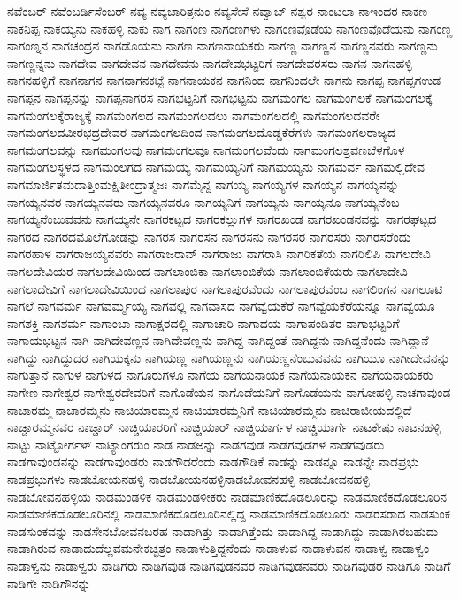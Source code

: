 {ನವೆಂಬರ್
ನವೆಂಬರ್ಡಿಸೆಂಬರ್
ನವ್ಯ
ನವ್ಯಚಾರಿತ್ರನುಂ
ನವ್ಯಸೇಸೆ
ನವ್ವಾಬ್
ನಶ್ವರ
ನಾಂಟಲಾ
ನಾಇಂದರ
ನಾಕಣ
ನಾಕನಿಪ್ಪ
ನಾಕಯ್ಯನು
ನಾಕಹಳ್ಳಿ
ನಾಕು
ನಾಗ
ನಾಗಂಣ
ನಾಗಂಣಗಳು
ನಾಗಂಣವೊಡೆಯ
ನಾಗಂಣವೊಡೆಯನು
ನಾಗಂಣ್ಣ
ನಾಗಂಣ್ನನ
ನಾಗಚಂದ್ರನ
ನಾಗಡೊಯನು
ನಾಗಣ
ನಾಗಣನಾಯಕರು
ನಾಗಣ್ಣ
ನಾಗಣ್ಣನ
ನಾಗಣ್ಣನವರು
ನಾಗಣ್ಣನು
ನಾಗಣ್ಣನ್ನನು
ನಾಗದೇವ
ನಾಗದೇವನ
ನಾಗದೇವನು
ನಾಗದೇವಭಟ್ಟರಿಗೆ
ನಾಗದೇವರಸರು
ನಾಗನ
ನಾಗನಹಳ್ಳಿ
ನಾಗನಹಳ್ಳಿಗೆ
ನಾಗನಾಗನ
ನಾಗನಾಗನಕಟ್ಟೆ
ನಾಗನಾಯಕನ
ನಾಗನಿಂದ
ನಾಗನಿಂದಲೇ
ನಾಗನು
ನಾಗಪ್ಪ
ನಾಗಪ್ಪಗಉಡ
ನಾಗಪ್ಪನ
ನಾಗಪ್ಪನನ್ನು
ನಾಗಪ್ಪನಾಗರಸ
ನಾಗಭಟ್ಟನಿಗೆ
ನಾಗಭಟ್ಟನು
ನಾಗಮಂಗಲ
ನಾಗಮಂಗಲಕೆ
ನಾಗಮಂಗಲಕ್ಕೆ
ನಾಗಮಂಗಲಕ್ಕೆರಾಜ್ಯಕ್ಕೆ
ನಾಗಮಂಗಲದ
ನಾಗಮಂಗಲದಲು
ನಾಗಮಂಗಲದಲ್ಲಿ
ನಾಗಮಂಗಲದವರೇ
ನಾಗಮಂಗಲದವೀರಭದ್ರದೇವರ
ನಾಗಮಂಗಲದಿಂದ
ನಾಗಮಂಗಲದೊಡ್ಡಕೆರೆಗಳು
ನಾಗಮಂಗಲರಾಜ್ಯದ
ನಾಗಮಂಗಲವನ್ನು
ನಾಗಮಂಗಲವು
ನಾಗಮಂಗಲವೂ
ನಾಗಮಂಗಲವೆಂದು
ನಾಗಮಂಗಲಶ್ರವಣಬೆಳಗೊಳ
ನಾಗಮಂಗಲಸ್ಥಳದ
ನಾಗಮಂಲಗದ
ನಾಗಮಯ್ಯ
ನಾಗಮಯ್ಯನಿಗೆ
ನಾಗಮಯ್ಯನು
ನಾಗಮರ್ವ
ನಾಗಮಲ್ಲಿದೇವ
ನಾಗಮಾರ್ಜಿತಮದಾತ್ತಿಂಮಕ್ಷಿತೀಂದ್ರಾತ್ಮಜಃ
ನಾಗಮೈನ್ದ
ನಾಗಯ್ಯ
ನಾಗಯ್ಯಗಳ
ನಾಗಯ್ಯನ
ನಾಗಯ್ಯನನ್ನು
ನಾಗಯ್ಯನವರ
ನಾಗಯ್ಯನವರು
ನಾಗಯ್ಯನವರೂ
ನಾಗಯ್ಯನಿಗೆ
ನಾಗಯ್ಯನು
ನಾಗಯ್ಯನೂ
ನಾಗಯ್ಯನೆಂಬ
ನಾಗಯ್ಯನೆಂಬುವವನು
ನಾಗಯ್ಯನೇ
ನಾಗರಕಟ್ಟದ
ನಾಗರಕಲ್ಲುಗಳ
ನಾಗರಖಂಡ
ನಾಗರಖಂಡನವನ್ನು
ನಾಗರಘಟ್ಟದ
ನಾಗರದ
ನಾಗರದಮೊಲೆಗೋಡನ್ನು
ನಾಗರಸ
ನಾಗರಸನ
ನಾಗರಸನು
ನಾಗರಸರ
ನಾಗರಸರು
ನಾಗರಸರೆಂದು
ನಾಗರಹಾಳ
ನಾಗರಾಜಯ್ಯನವರು
ನಾಗರಾಜರಾವ್
ನಾಗರಾಜು
ನಾಗರಾಸಿ
ನಾಗರಿಕತೆಯ
ನಾಗರಿಲಿಪಿ
ನಾಗಲದೇವಿ
ನಾಗಲದೇವಿಯರ
ನಾಗಲದೇವಿಯಿಂದ
ನಾಗಲಾಂಬಿಕಾ
ನಾಗಲಾಂಬಿಕೆಯ
ನಾಗಲಾಂಬಿಕೆಯರು
ನಾಗಲಾದೇವಿ
ನಾಗಲಾದೇವಿಗೆ
ನಾಗಲಾದೇವಿಯಿಂದ
ನಾಗಲಾಪುರ
ನಾಗಲಾಪುರವೆಂದು
ನಾಗಲಾಪುರವೆಂಬ
ನಾಗಲಿಂಗನ
ನಾಗಲೂಟಿ
ನಾಗಲೆ
ನಾಗವರ್ಮ
ನಾಗವರ್ಮ್ಮಯ್ಯ
ನಾಗವಲ್ಲಿ
ನಾಗವಾಸದ
ನಾಗವ್ವೆಯಕೆರೆ
ನಾಗವ್ವೆಯಕೆರೆಯನ್ನೂ
ನಾಗವ್ವೆಯೂ
ನಾಗಶಕ್ತಿ
ನಾಗಶರ್ಮ
ನಾಗಾಂಬಾ
ನಾಗಾಕ್ಷರದಲ್ಲಿ
ನಾಗಾಚಾರಿ
ನಾಗಾದಯ
ನಾಗಾಪಂಡಿತರ
ನಾಗಾಭಟ್ಟರಿಗೆ
ನಾಗಾಯಭಟ್ಟನ
ನಾಗಿ
ನಾಗಿದೇವಣ್ಣನ
ನಾಗಿದೇವಣ್ಣನು
ನಾಗಿದ್ದ
ನಾಗಿದ್ದಂತೆ
ನಾಗಿದ್ದನು
ನಾಗಿದ್ದನೆಂದು
ನಾಗಿದ್ದಾನೆ
ನಾಗಿದ್ದು
ನಾಗಿದ್ದುದರ
ನಾಗಿಯಕ್ಕನು
ನಾಗಿಯಣ್ಣ
ನಾಗಿಯಣ್ಣನು
ನಾಗಿಯಣ್ಣನೆಂಬುವವನು
ನಾಗಿಯೂ
ನಾಗೀದೇವನನ್ನು
ನಾಗುತ್ತಾನೆ
ನಾಗುಳ
ನಾಗುಳದ
ನಾಗೂರುಗಳೂ
ನಾಗೆಯ
ನಾಗೆಯನಾಯಕ
ನಾಗೆಯನಾಯಕನ
ನಾಗೆಯನಾಯಕರು
ನಾಗೇಣ
ನಾಗೇಶ್ವರ
ನಾಗೇಶ್ವರದೇವರಿಗೆ
ನಾಗೊಡೆಯನ
ನಾಗೊಡೆಯನಿಗೆ
ನಾಗೊಡೆಯನು
ನಾಗೋಹಳ್ಳಿ
ನಾಚಗಾವುಂಡ
ನಾಚಾರಮ್ಮ
ನಾಚಾರಮ್ಮನು
ನಾಚಿಯಾರಮ್ಮನ
ನಾಚಿಯಾರಮ್ಮನಿಗೆ
ನಾಚಿಯಾರಮ್ಮನು
ನಾಚಿರಾಜೀಯದಲ್ಲಿದೆ
ನಾಚ್ಚಾರಮ್ಮನವರ
ನಾಚ್ಚಾರ್
ನಾಚ್ಚಿಯಾರರಿಗೆ
ನಾಚ್ಚಿಯಾರ್
ನಾಚ್ಚಿಯಾರ್ಗಳ
ನಾಚ್ಚಿಯಾರ್ಗೆ
ನಾಟಕೇಷು
ನಾಟನಹಳ್ಳಿ
ನಾಟ್ಟು
ನಾಟ್ಟೋರ್ಗಳ್
ನಾಟ್ಯಾಂಗರುಂ
ನಾಡ
ನಾಡಅನ್ನು
ನಾಡಗವುಡ
ನಾಡಗವುಡಗಳ
ನಾಡಗವುಡರು
ನಾಡಗಾವುಂಡನನ್ನು
ನಾಡಗಾವುಂಡರು
ನಾಡಗೌಡರೆಂದು
ನಾಡಗೌಡಿಕೆ
ನಾಡನ್ನು
ನಾಡನ್ನೂ
ನಾಡನ್ನೇ
ನಾಡಪ್ರಭು
ನಾಡಪ್ರಭುಗಳು
ನಾಡಬೋಯನಹಳ್ಳಿ
ನಾಡಬೋಯನಹಳ್ಳಿನಾಡಬೋವನಹಳ್ಳಿ
ನಾಡಬೋವನಹಳ್ಳಿ
ನಾಡಬೋವನಹಳ್ಳಿಯ
ನಾಡಮಂಡಳಿಕ
ನಾಡಮಂಡಳೀಕರು
ನಾಡಮಾಣಿಕದೊಡಲೂರನ್ನು
ನಾಡಮಾಣಿಕದೊಡಲೂರಿನ
ನಾಡಮಾಣಿಕದೊಡಲೂರಿನಲ್ಲಿ
ನಾಡಮಾಣಿಕದೊಡಲೂರಿನಲ್ಲಿದ್ದ
ನಾಡಮಾಣಿಕದೊಡಲೂರು
ನಾಡರಸರಾದ
ನಾಡಸುಂಕ
ನಾಡಸುಂಕವನ್ನು
ನಾಡಸೇನಬೋವನಬರಹ
ನಾಡಾಗಿತ್ತು
ನಾಡಾಗಿತ್ತೆಂದು
ನಾಡಾಗಿದ್ದ
ನಾಡಾಗಿದ್ದು
ನಾಡಾಗಿರಬಹುದು
ನಾಡಾಗಿರುವ
ನಾಡಾದುದೆಲ್ಲವಮನೇಕಚ್ಛತ್ರಂ
ನಾಡಾಳುತ್ತಿದ್ದನೆಂದು
ನಾಡಾಳುವ
ನಾಡಾಳುವನ
ನಾಡಾಳ್ವ
ನಾಡಾಳ್ವಂ
ನಾಡಾಳ್ವನು
ನಾಡಾಳ್ವರು
ನಾಡಿಗರು
ನಾಡಿಗವುಡ
ನಾಡಿಗವುಡನವರ
ನಾಡಿಗವುಡನವರು
ನಾಡಿಗವುಡರ
ನಾಡಿಗೂ
ನಾಡಿಗೆ
ನಾಡಿಗೇ
ನಾಡಿಗೌನನ್ನು
}
